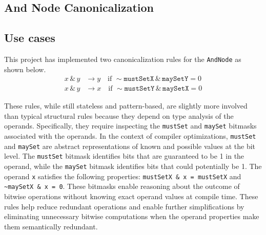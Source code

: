 \subsection{And Node Canonicalization}
\subsection*{Use cases}
This project has implemented two canonicalization rules for the \texttt{AndNode} as shown below.
\begin{align*}
    x \,\&\, y &\rightarrow y \quad \text{if } \sim \texttt{mustSetX} \,\&\, \texttt{maySetY} = 0 \\
    x \,\&\, y &\rightarrow x \quad \text{if } \sim \texttt{mustSetY} \,\&\, \texttt{maySetX} = 0
\end{align*}

These rules, while still stateless and pattern-based, are slightly more involved than typical structural rules because they depend on type analysis of the operands. Specifically, they require inspecting the \texttt{mustSet} and \texttt{maySet} bitmasks associated with the operands. In the context of compiler optimizations, \texttt{mustSet} and \texttt{maySet} are abstract representations of known and possible values at the bit level. The \texttt{mustSet} bitmask identifies bits that are guaranteed to be 1 in the operand, while the \texttt{maySet} bitmask identifies bits that could potentially be 1. The operand \texttt{x} satisfies the following properties: \texttt{mustSetX \& x = mustSetX} and \texttt{\textasciitilde maySetX \& x = 0}. 
These bitmasks enable reasoning about the outcome of bitwise operations without knowing exact operand values at compile time.
These rules help reduce redundant operations and enable further simplifications by eliminating unnecessary bitwise computations when the operand properties make them semantically redundant.

